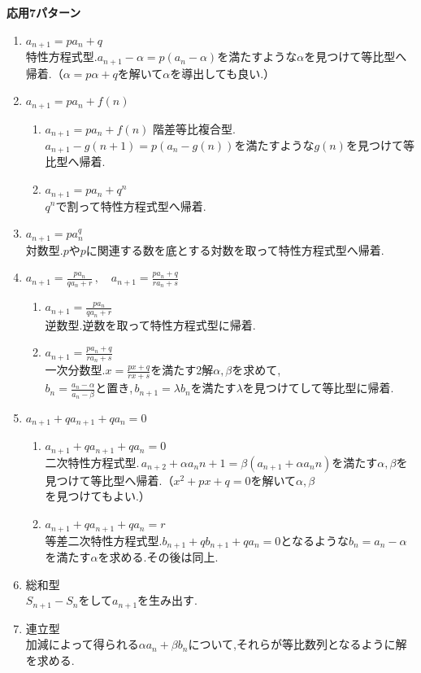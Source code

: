 \documentclass[dvipdfmx,a4paper,11pt,fleqn,openany]{jsbook}
\begin{document}
  \noindent \textbf{応用7パターン}
  \begin{enumerate}
    \item $a_{n+1}=pa_n+q$\\
          特性方程式型.$a_{n+1}-\alpha=p(a_n-\alpha)$を満たすような$\alpha$を見つけて等比型へ帰着.（$\alpha=p\alpha+q$を解いて$\alpha$を導出しても良い.）
    \item $a_{n+1}=pa_n+f(n)$\\
          \begin{enumerate}
            \item $a_{n+1}=pa_n+f(n)$
                  階差等比複合型.$a_{n+1}-g(n+1)=p(a_n-g(n))$を満たすような$g(n)$を見つけて等比型へ帰着.
            \item $a_{n+1}=pa_n+q^n$\\
                  $q^n$で割って特性方程式型へ帰着.
          \end{enumerate}
    \item $a_{n+1}=pa_n^q$\\
          対数型.$p$や$p$に関連する数を底とする対数を取って特性方程式型へ帰着.
    \item $\displaystyle a_{n+1}=\frac{pa_n}{qa_n+r}\,,\quad a_{n+1}=\frac{pa_n+q}{ra_n+s}$\\
          \begin{enumerate}
            \item $\displaystyle a_{n+1}=\frac{pa_n}{qa_n+r}$\\
                  逆数型.逆数を取って特性方程式型に帰着.
            \item $\displaystyle a_{n+1}=\frac{pa_n+q}{ra_n+s}$\\
                  一次分数型.$\displaystyle x=\frac{px+q}{rx+s}$を満たす2解$\alpha,\beta$を求めて,\\
                  $\displaystyle b_{n}=\frac{a_{n}-\alpha}{a_{n}-\beta}$と置き,\,$b_{n+1}=\lambda b_n$を満たす$\lambda$を見つけてして等比型に帰着.
          \end{enumerate}
    \item $a_{n+1}+qa_{n+1}+qa_n=0$
          \begin{enumerate}
            \item $a_{n+1}+qa_{n+1}+qa_n=0$\\
                  二次特性方程式型.\,$a_{n+2}+\alpha a_n{n+1}=\beta(a_{n+1}+\alpha a_n{n})$を満たす$\alpha,\beta$を見つけて等比型へ帰着.（$x^2+px+q=0$を解いて$\alpha,\beta$を見つけてもよい.）
            \item $a_{n+1}+qa_{n+1}+qa_n=r$\\
                  等差二次特性方程式型.$b_{n+1}+qb_{n+1}+qa_n=0$となるような$b_n=a_n-\alpha$を満たす$\alpha$を求める.その後は同上.
          \end{enumerate}
    \item 総和型\\
          $S_{n+1}-S_n$をして$a_{n+1}$を生み出す.
    \item 連立型\\
          加減によって得られる$\alpha a_{n}+\beta b_{n}$について,それらが等比数列となるように解を求める.
  \end{enumerate}
\end{document}
